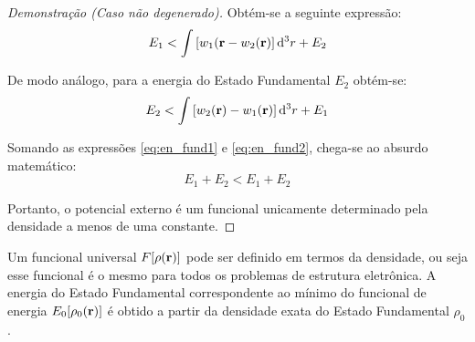 \begin{proof}[Demonstração (Caso não degenerado)]
	Obtém-se a seguinte expressão:
	\begin{equation}\label{eq:en_fund1}
		E_1<\int \bqty{w_1(\vb{r}-w_2(\vb{r})}\dd[3]{r}+E_2
	\end{equation}
	
	De modo análogo, para a energia do Estado Fundamental $ E_2 $ obtém-se:
	\begin{equation}\label{eq:en_fund2}
		E_2<\int \bqty{w_2(\vb{r})-w_1(\vb{r})}\dd[3]{r} +E_1
	\end{equation}
	
	Somando as expressões \eqref{eq:en_fund1} e \eqref{eq:en_fund2}, chega-se ao absurdo matemático:
	\begin{equation}
		E_1+E_2<E_1+E_2
	\end{equation}
	
	Portanto, o potencial externo é um funcional unicamente determinado pela densidade a menos de uma constante.
\end{proof}
\begin{teo}
	Um funcional universal $ F\bqty{\dens} $ pode ser definido em termos da densidade, ou seja esse funcional é o mesmo para todos os problemas de estrutura eletrônica. A energia do Estado Fundamental correspondente ao mínimo do funcional de energia $ E_0\bqty{\denzero} $ é obtido a partir da densidade exata do Estado Fundamental $ \rho_0 $. \cite{abc_dft}
\end{teo}

